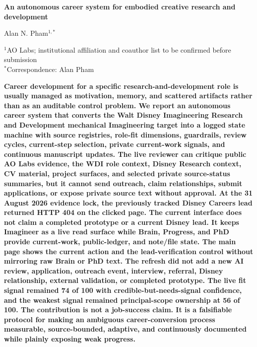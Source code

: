 \documentclass[12pt,letterpaper]{article}
\begin{document}
\linenumbers
\thispagestyle{empty}

\begin{center}
    \vspace*{-0.6em}

    {\fontsize{20}{22}\selectfont\bfseries\color{SumiInk}
    An autonomous career system for embodied creative research and development\par}

    \vspace{0.95em}

    {\normalsize\color{SumiInk}
    Alan N. Pham$^{1,*}$\par}

    \vspace{0.38em}

    {\small\color{DustyTaupe}
    $^{1}$AO Labs; institutional affiliation and coauthor list to be confirmed before submission\\
    $^{*}$Correspondence: Alan Pham\par}
\end{center}

\vspace{0.35em}
\noindent\textbf{Career development for a specific research-and-development role is usually managed as motivation, memory, and scattered artifacts rather than as an auditable control problem. We report an autonomous career system that converts the Walt Disney Imagineering Research and Development mechanical Imagineering target into a logged state machine with source registries, role-fit dimensions, guardrails, review cycles, current-step selection, private current-work signals, and continuous manuscript updates. The live reviewer can critique public AO Labs evidence, the WDI role context, Disney Research context, CV material, project surfaces, and selected private source-status summaries, but it cannot send outreach, claim relationships, submit applications, or expose private source text without approval. At the 31 August 2026 evidence lock, the previously tracked Disney Careers lead returned HTTP 404 on the clicked page. The current interface does not claim a completed prototype or a current Disney lead. It keeps Imagineer as a live read surface while Brain, Progress, and PhD provide current-work, public-ledger, and note/file state. The main page shows the current action and the lead-verification control without mirroring raw Brain or PhD text. The refresh did not add a new AI review, application, outreach event, interview, referral, Disney relationship, external validation, or completed prototype. The live fit signal remained 74 of 100 with credible-but-needs-signal confidence, and the weakest signal remained principal-scope ownership at 56 of 100. The contribution is not a job-success claim. It is a falsifiable protocol for making an ambiguous career-conversion process measurable, source-bounded, adaptive, and continuously documented while plainly exposing weak progress.}
\end{document}
